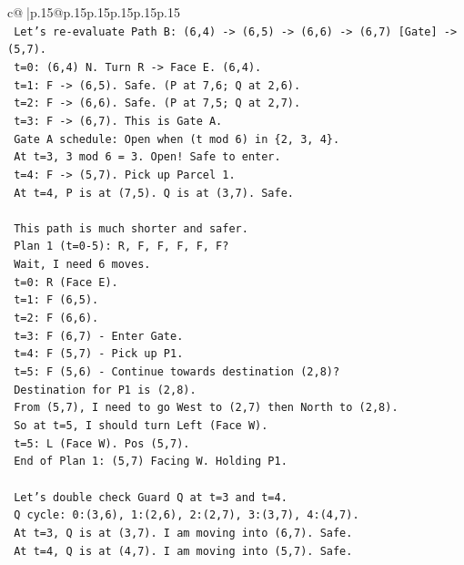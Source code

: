\documentclass{article}
\begin{document}
{\begin{supertabular}{c@{$\;$}|p{.15\linewidth}@{}p{.15\linewidth}p{.15\linewidth}p{.15\linewidth}p{.15\linewidth}p{.15\linewidth}}
{{{\\ 
\texttt{  Let's re{-}evaluate Path B: (6,4) {-}> (6,5) {-}> (6,6) {-}> (6,7) {[}Gate{]} {-}> (5,7).} \\
\texttt{  t=0: (6,4) N. Turn R {-}> Face E. (6,4).} \\
\texttt{  t=1: F {-}> (6,5). Safe. (P at 7,6; Q at 2,6).} \\
\texttt{  t=2: F {-}> (6,6). Safe. (P at 7,5; Q at 2,7).} \\
\texttt{  t=3: F {-}> (6,7). This is Gate A.} \\
\texttt{     Gate A schedule: Open when (t mod 6) in \{2, 3, 4\}.} \\
\texttt{     At t=3, 3 mod 6 = 3. Open! Safe to enter.} \\
\texttt{  t=4: F {-}> (5,7). Pick up Parcel 1.} \\
\texttt{     At t=4, P is at (7,5). Q is at (3,7). Safe.} \\
\\ 
\texttt{  This path is much shorter and safer.} \\
\texttt{  Plan 1 (t=0{-}5): R, F, F, F, F, F?} \\
\texttt{  Wait, I need 6 moves.} \\
\texttt{  t=0: R (Face E).} \\
\texttt{  t=1: F (6,5).} \\
\texttt{  t=2: F (6,6).} \\
\texttt{  t=3: F (6,7) {-} Enter Gate.} \\
\texttt{  t=4: F (5,7) {-} Pick up P1.} \\
\texttt{  t=5: F (5,6) {-} Continue towards destination (2,8)?} \\
\texttt{     Destination for P1 is (2,8).} \\
\texttt{     From (5,7), I need to go West to (2,7) then North to (2,8).} \\
\texttt{     So at t=5, I should turn Left (Face W).} \\
\texttt{     t=5: L (Face W). Pos (5,7).} \\
\texttt{  End of Plan 1: (5,7) Facing W. Holding P1.} \\
\\ 
\texttt{  Let's double check Guard Q at t=3 and t=4.} \\
\texttt{  Q cycle: 0:(3,6), 1:(2,6), 2:(2,7), 3:(3,7), 4:(4,7).} \\
\texttt{  At t=3, Q is at (3,7). I am moving into (6,7). Safe.} \\
\texttt{  At t=4, Q is at (4,7). I am moving into (5,7). Safe.} \\
}}}
\end{supertabular}}
\end{document}
